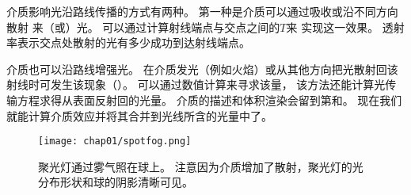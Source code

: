 介质影响光沿路线传播的方式有两种。
第一种是介质可以通过吸收或沿不同方向散射
来（或）光。
可以通过计算射线端点与交点之间的$T$来
实现这一效果。
透射率表示交点处散射的光有多少成功到达射线端点。

介质也可以沿路线增强光。
在介质发光（例如火焰）或从其他方向把光散射回该射线时可发生该现象（）。
可以通过数值计算来寻求该量，
该方法还能计算光传输方程求得从表面反射回的光量。
介质的描述和体积渲染会留到第和。
现在我们就能计算介质效应并将其合并到光线所含的光量中了。
\begin{figure}
      \centering
      \texttt{[image: chap01/spotfog.png]}
      \caption{聚光灯通过雾气照在球上。
      注意因为介质增加了散射，聚光灯的光分布形状和球的阴影清晰可见。}
      \label{fig:1.10}
\end{figure}